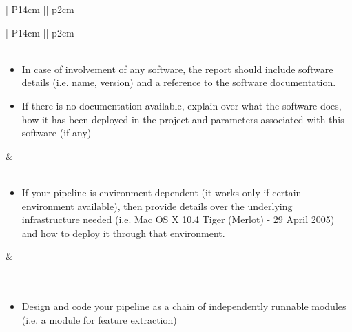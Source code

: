 \begin{table}[ht]
\begin{tabular}{| P{14cm} || p{2cm} |}
    \end{tabular}
    \captionsetup{font=small,width=12cm}
    \caption{Reproducible experiment report checklist}
    \label{tab:table3}
    
\end{table}

\begin{table}[ht]
    \centering
    \begin{tabular}{| P{14cm} || p{2cm} |}
        \hline
        \\
        \hline \hline
        \\ 
        \hline
            \begin{itemize}
                \item 
                {\small In case of involvement of any software, the report should include software details (i.e. name, version) and a reference
                to the software documentation.} 
                \item
                {\small  If there is no documentation available, explain over what the software does, how it has been deployed in the project and  
                parameters associated with this software (if any)}
            \end{itemize} &\\
        \hline
        \\ 
        \hline
            \begin{itemize}
                \item
                {\small If your pipeline is environment-dependent (it works only if certain environment available), then provide details over the 
                underlying infrastructure needed (i.e. Mac OS X 10.4 Tiger (Merlot) - 29 April 2005) and how to deploy it through that environment.}
            \end{itemize} &\\
        \hline \hline
        \\
        \hline \hline
        \\ 
        \hline
            \begin{itemize}
                \item
                {\small Design and code your pipeline as a chain of independently runnable modules (i.e. a module for feature extraction) 
}
\end{itemize}
\end{tabular}
\end{table}
